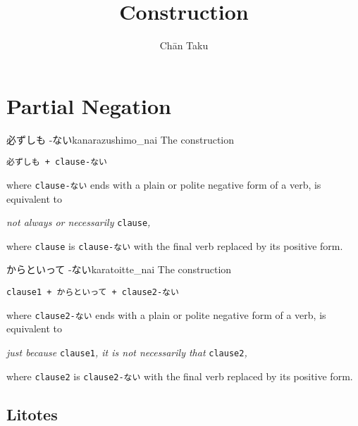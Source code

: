 \documentclass{article}
\title{Construction}
\author{Ch\=an Taku}
\begin{document}
\maketitle

\section{Partial Negation}

\begin{proposition}{必ずしも -ない}{kanarazushimo_nai}
    The construction
    \begin{center}
        \texttt{必ずしも + clause-ない}
    \end{center}
    where \texttt{clause-ない} ends with a plain or polite negative form of a verb, is equivalent to
    \begin{center}
        \textit{not always or necessarily } \texttt{clause}\textit{,}
    \end{center}
    where \texttt{clause} is \texttt{clause-ない} with the final verb replaced by its positive form.
\end{proposition}

\begin{proposition}{からといって -ない}{karatoitte_nai}
    The construction
    \begin{center}
        \texttt{clause1 + からといって + clause2-ない}
    \end{center}
    where \texttt{clause2-ない} ends with a plain or polite negative form of a verb, is equivalent to
    \begin{center}
        \textit{just because} \texttt{clause1}\textit{, it is not necessarily that} \texttt{clause2}\textit{,}
    \end{center}
    where \texttt{clause2} is \texttt{clause2-ない} with the final verb replaced by its positive form.
\end{proposition}

\subsection{Litotes}
\end{document}
